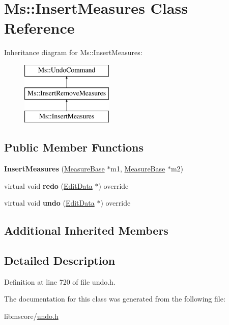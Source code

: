 \hypertarget{class_ms_1_1_insert_measures}{}\section{Ms\+:\+:Insert\+Measures Class Reference}
\label{class_ms_1_1_insert_measures}
Inheritance diagram for Ms\+:\+:Insert\+Measures\+:\begin{figure}[H]
\begin{center}
\leavevmode
\includegraphics[height=3.000000cm]{class_ms_1_1_insert_measures}
\end{center}
\end{figure}
\subsection*{Public Member Functions}
\begin{DoxyCompactItemize}
\item 
\mbox{\label{class_ms_1_1_insert_measures_a1bd61119f8b196c0b48f2bca725d6423}} 
{\bfseries Insert\+Measures} (\hyperlink{class_ms_1_1_measure_base}{Measure\+Base} $\ast$m1, \hyperlink{class_ms_1_1_measure_base}{Measure\+Base} $\ast$m2)
\item 
\mbox{\label{class_ms_1_1_insert_measures_a45216b6e3c7478f36c5d6b49a3533cb3}} 
virtual void {\bfseries redo} (\hyperlink{class_ms_1_1_edit_data}{Edit\+Data} $\ast$) override
\item 
\mbox{\label{class_ms_1_1_insert_measures_a5af3fa88bd1dba004d98eebb8fe49a0c}} 
virtual void {\bfseries undo} (\hyperlink{class_ms_1_1_edit_data}{Edit\+Data} $\ast$) override
\end{DoxyCompactItemize}
\subsection*{Additional Inherited Members}


\subsection{Detailed Description}


Definition at line 720 of file undo.\+h.



The documentation for this class was generated from the following file\+:\begin{DoxyCompactItemize}
\item 
libmscore/\hyperlink{undo_8h}{undo.\+h}\end{DoxyCompactItemize}
